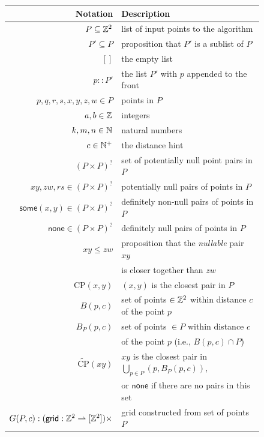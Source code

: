 \documentclass{article}
\begin{document}
\begin{figure}[H]
\begin{center}\label{fig:notation_summary}
\begin{tabular} {|| r | l ||}
  \hline
  Notation & Description \\
  \hline
  \hline
  $P \subseteq \mathbb{Z}^2$ & list of input points to the algorithm \\
  \hline
  $P' \subseteq P$ & proposition that $P'$ is a sublist of $P$ \\
  \hline
  $[]$ & the empty list \\
  \hline
  $p :: P'$ & the list $P'$ with $p$ appended to the front \\
  \hline
  $p, q, r, s, x, y, z, w \in P$ & points in $P$ \\
  \hline
  $a, b \in \mathbb{Z}$ & integers \\
  \hline
  $k, m, n \in \mathbb{N}$ & natural numbers \\
  \hline
  $c \in \mathbb{N}^+$ & the distance hint \\
  \hline
  $(P \times P)^?$ & set of potentially null point pairs in $P$ \\
  \hline
  $x\!y, z\!w, r\!s \in (P \times P)^?$ & potentially null pairs of points in $P$ \\
  \hline
  $\mathsf{some}(x, y) \in (P \times P)^?$ & definitely non-null pairs of points in $P$ \\
  \hline
  $\mathsf{none} \in (P \times P)^?$ & definitely null pairs of points in $P$ \\
  \hline
  $x\!y \leq z\!w$ & proposition that the \textit{nullable} pair $x\!y$ \\ & is closer together than $z\!w$ \\
  \hline
  $\text{CP}(x, y)$ & $(x, y)$ is the closest pair in $P$ \\
  \hline
  $B(p, c)$ & set of points $\in \mathbb{Z}^2$ within distance $c$ of the point $p$ \\
  \hline
  $B_P(p, c)$ & set of points $\in P$ within distance $c$ \\ & of the point $p$ (i.e., $B(p, c) \cap P$) \\
  \hline
  $\widetilde{\text{CP}}(x\!y)$ & $x\!y$ is the closest pair in $\bigcup_{p \in P} \left(p, B_P(p, c)\right)$, \\ & or $\mathsf{none}$ if there are no pairs in this set \\
  \hline
  $G(P, c) : (\mathsf{grid} : \mathbb{Z}^2 \rightharpoonup [\mathbb{Z}^2]) \times$ & grid constructed from set of points $P$ \\

\end{tabular}
\end{center}
\end{figure}
\end{document}
